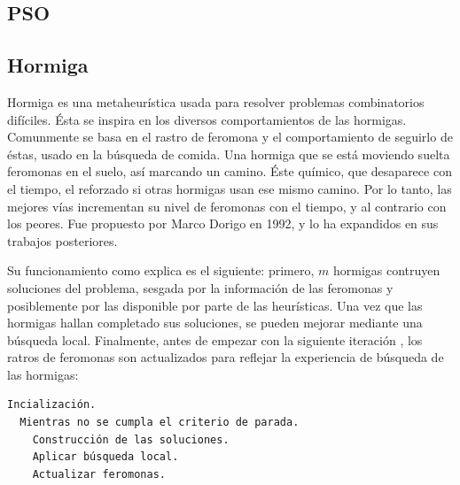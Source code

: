 \cite{SwAjAm2008}

\subsection{PSO} \label{sect:metapso}

\subsection{Hormiga} \label{sect:metaant}

Hormiga es una metaheurística usada para resolver problemas combinatorios
difíciles. \'Esta se inspira en los diversos comportamientos de las hormigas.
Comunmente se basa en el rastro de feromona y el comportamiento de seguirlo 
de éstas, usado en la búsqueda de comida. Una hormiga que se est\'a moviendo 
suelta feromonas en el suelo, as\'i marcando un camino. \'Este químico, que 
desaparece con el tiempo, el reforzado si otras hormigas usan ese mismo camino.
Por lo tanto, las mejores v\'ias incrementan su nivel de feromonas con el tiempo, 
y al contrario con los peores. Fue propuesto por Marco Dorigo en 1992, 
y lo ha expandidos en sus trabajos posteriores.
\cite{GePo2010} \cite{Le2007}

Su funcionamiento como explica \cite{GePo2010} es el siguiente: primero, $m$ hormigas contruyen
soluciones del problema, sesgada por la informaci\'on de las feromonas y posiblemente
por las disponible por parte de las heur\'isticas. Una vez que las hormigas hallan completado
sus soluciones, se pueden mejorar mediante una b\'usqueda local. Finalmente,
antes de empezar con la siguiente iteraci\'on , los ratros de feromonas son
actualizados para reflejar la experiencia de b\'usqueda de las hormigas:

\begin{lstlisting}[mathescape, language=Pascal]
  Incialización.
  Mientras no se cumpla el criterio de parada.
    Construcción de las soluciones.
    Aplicar búsqueda local.
    Actualizar feromonas.
\end{lstlisting}

